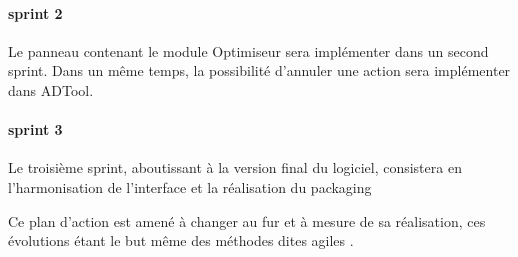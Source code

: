 		\paragraph{sprint 2} Le panneau contenant le module Optimiseur sera implémenter dans un second sprint. Dans un même temps, la possibilité d'annuler une action sera implémenter dans ADTool. 

		\paragraph{sprint 3} Le troisième sprint, aboutissant à la version final du logiciel, consistera en l'harmonisation de l'interface et la réalisation du packaging 


	Ce plan d'action est amené à changer au fur et à mesure de sa réalisation, ces évolutions étant le but même des méthodes dites \og agiles \fg.
	

